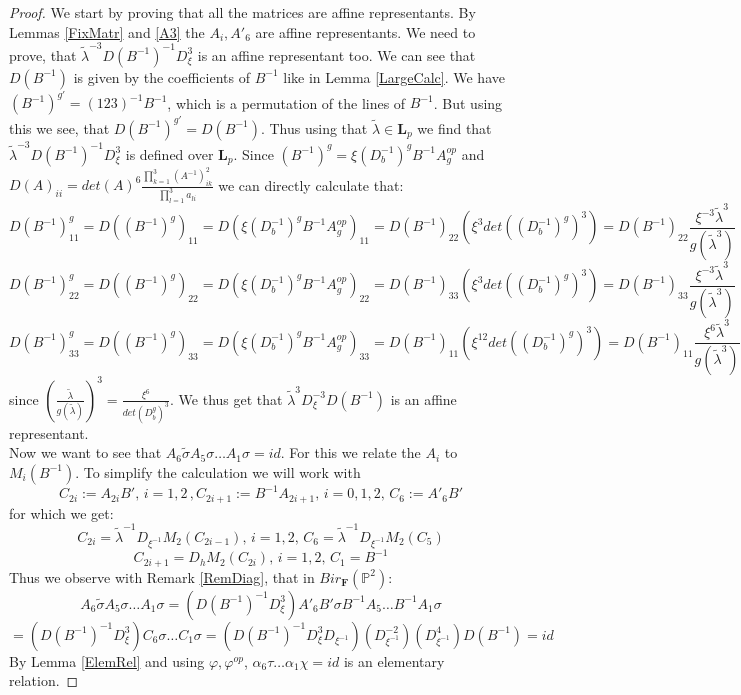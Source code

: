 \documentclass[12pt, oneside, reqno]{amsart}
\begin{document}
\begin{proof}
    We start by proving that all the matrices are affine representants. By Lemmas \ref{FixMatr} and \ref{A3} the $A_i, A'_6$ are affine representants. We need to prove, that $ \tilde \lambda^{-3} D(B^{-1})^{-1}D_{\xi}^3$ is an affine representant too. We can see that $D(B^{-1})$ is given by the coefficients of $B^{-1}$ like in Lemma \ref{LargeCalc}. We have $(B^{-1})^{g'} = (123)^{-1}B^{-1}$, which is a permutation of the lines of $B^{-1}$. But using this we see, that $D(B^{-1})^{g'} = D(B^{-1})$. Thus using that $\tilde \lambda \in \textbf{L}_p$ we find that $ \tilde \lambda^{-3} D(B^{-1})^{-1}D_{\xi}^3$ is defined over $\textbf{L}_p$. Since $(B^{-1})^g = \xi (D_b^{-1})^g B^{-1}A_g^{op}$ and $D(A)_{ii} = det(A)^6\frac{\prod_{k=1}^3(A^{-1})_{ik}^2}{\prod_{l=1}^3a_{li}}$ we can directly calculate that: 
    \[D(B^{-1})^g_{11} = D((B^{-1})^g)_{11} = D(\xi (D_b^{-1})^g B^{-1}A_g^{op})_{11} = D(B^{-1})_{22} (\xi^3 det((D_b^{-1})^g)^3) = D(B^{-1})_{22} \frac{\xi^{-3} \tilde \lambda^3}{g(\tilde \lambda ^3)}\]
    \[D(B^{-1})^g_{22} = D((B^{-1})^g)_{22} = D(\xi (D_b^{-1})^g B^{-1}A_g^{op})_{22} = D(B^{-1})_{33} (\xi^3 det((D_b^{-1})^g)^3) =D(B^{-1})_{33} \frac{\xi^{-3} \tilde \lambda^3}{g(\tilde \lambda ^3)}\]
    \[D(B^{-1})^g_{33} = D((B^{-1})^g)_{33} = D(\xi (D_b^{-1})^g B^{-1}A_g^{op})_{33} = D(B^{-1})_{11} (\xi^{12} det((D_b^{-1})^g)^3) = D(B^{-1})_{11} \frac{\xi^{6} \tilde \lambda^3}{g(\tilde \lambda ^3)}\]
    since $(\frac{\tilde \lambda}{g(\tilde \lambda)})^3 = \frac{\xi^6}{det(D_b^g)^3}$. We thus get that $\tilde \lambda^{3} D_{\xi}^{-3} D(B^{-1})$ is an affine representant. \\ Now we want to see that $A_6 \tilde \sigma A_5 \sigma \dots A_1 \sigma = id$. For this we relate the $A_i$ to $M_i(B^{-1})$. To simplify the calculation we will work with 
    \[C_{2i} := A_{2i} B', \, i = 1,2 \, , C_{2i + 1} := B^{-1} A_{2i + 1}, \, i = 0,1,2, \, C_{6} := A'_{6} B' \]
    for which we get:
    \[C_{2i} = \tilde \lambda^{-1} D_{\xi^{-1}} M_2(C_{2i -1}), \, i = 1,2, \, C_{6} = \tilde \lambda^{-1} D_{\xi^{-1}} M_2(C_{5})\] 
    \[ C_{2i + 1}  = D_h M_2(C_{2i}), \, i=1,2, \, C_1 = B^{-1}\] 
    Thus we observe with Remark \ref{RemDiag}, that in $Bir_{\textbf{F}}(\mathbb{P}^2)$: 
    \[A_6 \tilde \sigma A_5 \sigma \dots A_1 \sigma = (D(B^{-1})^{-1}D_{\xi}^3) A'_6 B' \sigma B^{-1} A_5 \dots B^{-1}A_1 \sigma \] \[= (D(B^{-1})^{-1}D_{\xi}^3) C_6\sigma \dots C_1 \sigma = (D(B^{-1})^{-1}D_{\xi}^3 D_{\xi^{-1}}) (D_{\xi^{-1}}^{-2}) (D_{\xi^{-1}}^4) D(B^{-1}) = id \] 
    By Lemma \ref{ElemRel} and using $\varphi, \varphi^{op}$, $\alpha_6 \tau \dots \alpha_1 \chi = id$ is an elementary relation.
\end{proof}
\end{document}
